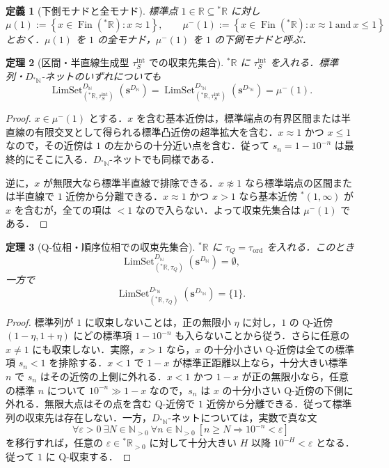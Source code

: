 \documentclass[a4paper,11pt]{ltjsarticle}
\theoremstyle{jpdef}
\newtheorem{definition}{定義}[section]
\theoremstyle{jpthm}
\newtheorem{theorem}[definition]{定理}
\newcommand{\N}{\mathbb{N}}
\newcommand{\R}{\mathbb{R}}
\newcommand{\LimSet}{\operatorname{LimSet}}
\newcommand{\Fin}{\operatorname{Fin}}
\newcommand{\Ns}{\N_{>0}}
\newcommand{\DN}{D_{\N}}
\newcommand{\DStarN}{D_{{}^{\ast}\N}}
\newcommand{\set}[1]{\left\{#1\right\}}
\newcommand{\ulim}[1]{{}^{\ast}#1}
\newcommand{\tauintS}{\tau^{\mathrm{int}}_{S}}
\newcommand{\tauQ}{\tau_{Q}}
\newcommand{\tauord}{\tau_{\mathrm{ord}}}
\newcommand{\eps}{\varepsilon}
\begin{document}
\begin{definition}[下側モナドと全モナド]
標準点 \(1\in\R\subseteq\ulim\R\) に対し
\[
  \mu(1):=\set{x\in\Fin(\ulim\R):x\approx1},
  \qquad
  \mu^-(1):=\set{x\in\Fin(\ulim\R):x\approx1\ \text{and}\ x\le1}
\]
とおく．\(\mu(1)\) を \(1\) の全モナド，\(\mu^-(1)\) を \(1\) の下側モナドと呼ぶ．
\end{definition}

\begin{theorem}[区間・半直線生成型 \(\tauintS\) での収束先集合]
\(\ulim\R\) に \(\tauintS\) を入れる．標準列・\(\DStarN\)-ネットのいずれについても
\[
  \LimSet^{\DN}_{(\ulim\R,\tauintS)}(\mathbf s^{\DN})
  =
  \LimSet^{\DStarN}_{(\ulim\R,\tauintS)}(\mathbf s^{\DStarN})
  =\mu^-(1).
\]
\end{theorem}

\begin{proof}
\(x\in\mu^-(1)\) とする．\(x\) を含む基本近傍は，標準端点の有界区間または半直線の有限交叉として得られる標準凸近傍の超準拡大を含む．\(x\approx1\) かつ \(x\le1\) なので，その近傍は \(1\) の左からの十分近い点を含む．従って \(s_n=1-10^{-n}\) は最終的にそこに入る．\(\DStarN\)-ネットでも同様である．

逆に，\(x\) が無限大なら標準半直線で排除できる．\(x\not\approx1\) なら標準端点の区間または半直線で \(1\) 近傍から分離できる．\(x\approx1\) かつ \(x>1\) なら基本近傍 \(\ulim(1,\infty)\) が \(x\) を含むが，全ての項は \(<1\) なので入らない．よって収束先集合は \(\mu^-(1)\) である．
\end{proof}

\begin{theorem}[Q-位相・順序位相での収束先集合]
\(\ulim\R\) に \(\tauQ=\tauord\) を入れる．このとき
\[
  \LimSet^{\DN}_{(\ulim\R,\tauQ)}(\mathbf s^{\DN})=\emptyset,
\]
一方で
\[
  \LimSet^{\DStarN}_{(\ulim\R,\tauQ)}(\mathbf s^{\DStarN})=\{1\}.
\]
\end{theorem}

\begin{proof}
標準列が \(1\) に収束しないことは，正の無限小 \(\eta\) に対し，\(1\) の Q-近傍 \((1-\eta,1+\eta)\) にどの標準項 \(1-10^{-n}\) も入らないことから従う．さらに任意の \(x\ne1\) にも収束しない．実際，\(x>1\) なら，\(x\) の十分小さい Q-近傍は全ての標準項 \(s_n<1\) を排除する．\(x<1\) で \(1-x\) が標準正距離以上なら，十分大きい標準 \(n\) で \(s_n\) はその近傍の上側に外れる．\(x<1\) かつ \(1-x\) が正の無限小なら，任意の標準 \(n\) について \(10^{-n}\gg 1-x\) なので，\(s_n\) は \(x\) の十分小さい Q-近傍の下側に外れる．無限大点はその点を含む Q-近傍で \(1\) 近傍から分離できる．従って標準列の収束先は存在しない．一方，\(\DStarN\)-ネットについては，実数で真な文
\[
  \forall\eps>0\ \exists N\in\Ns\ \forall n\in\Ns\ [n\ge N\Rightarrow10^{-n}<\eps]
\]
を移行すれば，任意の \(\eps\in\ulim\R_{>0}\) に対して十分大きい \(H\) 以降 \(10^{-H}<\eps\) となる．従って \(1\) に Q-収束する．
\end{proof}
\end{document}
